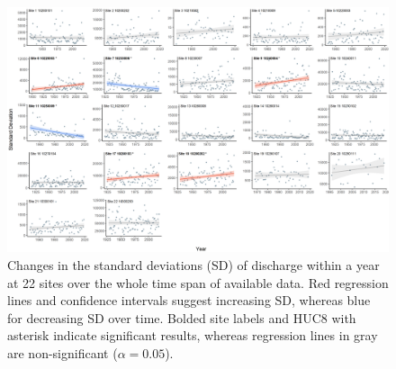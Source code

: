 \documentclass[12pt,]{article}
\makeatletter
\def\maxwidth{\ifdim\Gin@nat@width>\linewidth\linewidth\else\Gin@nat@width\fi}
\makeatother
\begin{document}
\begin{figure}[H]
\includegraphics[width=\maxwidth]{../Figures/sd_year} \caption{\label{fig:varfig} Changes in the standard deviations (SD) of discharge within a year at 22 sites over the whole time span of available data. Red regression lines and confidence intervals suggest increasing SD, whereas blue for decreasing SD over time. Bolded site labels and HUC8 with asterisk indicate significant results, whereas regression lines in gray are non-significant ($\alpha = 0.05$).}\label{fig:varfig}
\end{figure}
\end{document}
